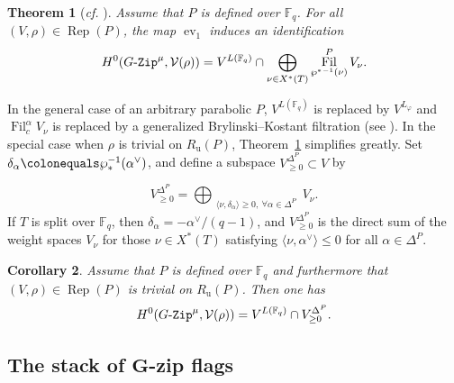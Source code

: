 \documentclass[10pt,a4paper]{article}
\numberwithin{equation}{section}
\newtheorem{theorem}{Theorem}[section]
\newtheorem{corollary}[theorem]{Corollary}
\theoremstyle{definition}
\theoremstyle{remark}
\newcommand{\GZip}{\mathop{\text{$G$-{\tt Zip}}}\nolimits}
\newcommand{\Vcal}{{\mathcal V}}
\newcommand{\FF}{\mathbb{F}}
\DeclareMathOperator{\Rep}{Rep}
\DeclareMathOperator{\fil}{Fil}
\DeclareMathOperator{\Fil}{Fil}
\DeclareMathOperator{\ev}{ev}
\begin{document}
\begin{theorem}[\textit{cf.} {\cite[Corollary 3.4.2]{Imai-Koskivirta-vector-bundles}}]\label{main-Fq}
Assume that $P$ is defined over $\FF_q$. 
For all $(V,\rho)\in \Rep(P)$, the map $\ev_1$ induces an identification
\begin{equation}
H^0(\GZip^\mu,\Vcal(\rho))=V^{L(\FF_q)}\cap 
 \bigoplus_{\nu \in X^*(T)} 
 \fil_{{\wp^*}^{-1}(\nu)}^P 
 V_{\nu}.
\end{equation}
\end{theorem}

In the general case of an arbitrary parabolic $P$, $V^{L(\FF_q)}$ is replaced by $V^{L_\varphi}$ and $\Fil^\alpha_c V_\nu$ is replaced by a generalized Brylinski--Kostant filtration (see \cite[Theorem 3.4.1]{Imai-Koskivirta-vector-bundles}). In the special case when $\rho$ is trivial on $R_{\mathrm{u}}(P)$, Theorem~\ref{main-Fq} simplifies greatly. Set $\delta_{\alpha}\colonequals \wp_*^{-1}(\alpha^\vee)$, and define a subspace $V_{\geq 0}^{\Delta^P}\subset V$ by

\begin{equation}\label{equ-VDeltaP}
V_{\geq 0}^{\Delta^P} = \bigoplus_{\substack{\langle \nu,\delta_{\alpha} \rangle \geq 0, \ 
 \forall \alpha\in \Delta^P}} V_\nu.
\end{equation}
If $T$ is split over $\FF_q$, then 
$\delta_{\alpha}=-\alpha^\vee /(q-1)$, 
and $V_{\geq 0}^{\Delta^P}$ is the direct sum of the weight spaces $V_\nu$ for those $\nu\in X^*(T)$ satisfying $\langle \nu,\alpha^\vee \rangle \leq 0$ for all $\alpha \in \Delta^P$. 


\begin{corollary}\label{cor-Fq-Levi}
Assume that $P$ is defined over $\FF_q$ and furthermore that $(V,\rho)\in \Rep(P)$ is trivial on $R_{\mathrm{u}}(P)$. Then one has
\begin{equation}
H^0(\GZip^\mu,\Vcal(\rho))=V^{L(\FF_q)}\cap V_{\geq 0}^{\Delta^P} .
\end{equation}
\end{corollary}



\subsection{The stack of $\boldsymbol{G}$-zip flags} \label{subsec-zipflag}
\end{document}
